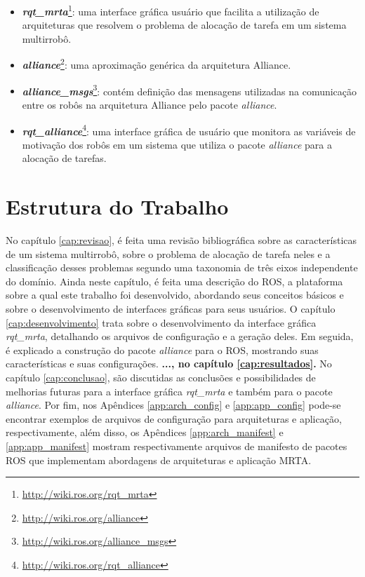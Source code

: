         \begin{itemize}
            \item \textbf{\textit{rqt\_mrta}}\footnote{\url{http://wiki.ros.org/rqt_mrta}}: uma interface gráfica usuário que facilita a utilização de arquiteturas que resolvem o problema de alocação de tarefa em um sistema multirrobô.
            \item \textbf{\textit{alliance}}\footnote{\url{http://wiki.ros.org/alliance}}: uma aproximação genérica da arquitetura Alliance.
            \item \textbf{\textit{alliance\_msgs}}\footnote{\url{http://wiki.ros.org/alliance_msgs}}: contém definição das mensagens utilizadas na comunicação entre os robôs na arquitetura Alliance pelo pacote \textit{alliance}.
            \item \textbf{\textit{rqt\_alliance}}\footnote{\url{http://wiki.ros.org/rqt_alliance}}: uma interface gráfica de usuário que monitora as variáveis de motivação dos robôs em um sistema que utiliza o pacote \textit{alliance} para a alocação de tarefas.
        \end{itemize}
    
    \section{Estrutura do Trabalho} \label{sec:estrutura}
        No capítulo \ref{cap:revisao}, é feita uma revisão bibliográfica sobre as características de um sistema multirrobô, sobre o problema de alocação de tarefa neles e a classificação desses problemas segundo uma taxonomia de três eixos independente do domínio. Ainda neste capítulo, é feita uma descrição do ROS, a plataforma sobre a qual este trabalho foi desenvolvido, abordando seus conceitos básicos e sobre o desenvolvimento de interfaces gráficas para seus usuários. O capítulo \ref{cap:desenvolvimento} trata sobre o desenvolvimento da interface gráfica \textit{rqt\_mrta}, detalhando os arquivos de configuração e a geração deles. Em seguida, é explicado a construção do pacote \textit{alliance} para o ROS, mostrando suas características e suas configurações. \textbf{\color{red}..., no capítulo \ref{cap:resultados}.} No capítulo \ref{cap:conclusao}, são discutidas as conclusões e possibilidades de melhorias futuras para a interface gráfica \textit{rqt\_mrta} e também para o pacote \textit{alliance}. Por fim, nos Apêndices \ref{app:arch_config} e \ref{app:app_config} pode-se encontrar exemplos de arquivos de configuração para arquiteturas e aplicação, respectivamente, além disso, os Apêndices \ref{app:arch_manifest} e \ref{app:app_manifest} mostram respectivamente arquivos de manifesto de pacotes ROS que implementam abordagens de arquiteturas e aplicação MRTA.